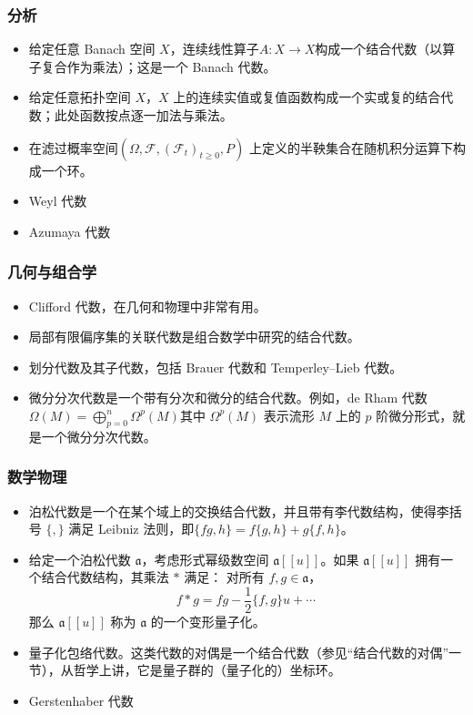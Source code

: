 \subsubsection{分析}
\begin{itemize}
\item 给定任意 Banach 空间 $X$，连续线性算子$A : X \to X$构成一个结合代数（以算子复合作为乘法）；这是一个 Banach 代数。
\item 给定任意拓扑空间 $X$，$X$ 上的连续实值或复值函数构成一个实或复的结合代数；此处函数按点逐一加法与乘法。
\item 在滤过概率空间$(\Omega, \mathcal{F}, (\mathcal{F}_t)_{t \geq 0}, P)$
上定义的半鞅集合在随机积分运算下构成一个环。
\item Weyl 代数
\item Azumaya 代数
\end{itemize}
\subsubsection{几何与组合学}
\begin{itemize}
\item Clifford 代数，在几何和物理中非常有用。
\item 局部有限偏序集的关联代数是组合数学中研究的结合代数。
\item 划分代数及其子代数，包括 Brauer 代数和 Temperley–Lieb 代数。
\item 微分分次代数是一个带有分次和微分的结合代数。例如，de Rham 代数$\Omega(M) = \bigoplus_{p=0}^n \Omega^p(M)$其中 $\Omega^p(M)$ 表示流形 $M$ 上的 $p$ 阶微分形式，就是一个微分分次代数。
\end{itemize}
\subsubsection{数学物理}
\begin{itemize}
\item 泊松代数是一个在某个域上的交换结合代数，并且带有李代数结构，使得李括号 $\{,\}$ 满足 Leibniz 法则，即$\{fg, h\} = f \{g, h\} + g \{f, h\}$。
\item 给定一个泊松代数 $\mathfrak{a}$，考虑形式幂级数空间 $\mathfrak{a}[\![u]\!]$。如果 $\mathfrak{a}[\![u]\!]$ 拥有一个结合代数结构，其乘法 $*$ 满足：
  对所有 $f, g \in \mathfrak{a}$，
  $$
  f * g = fg - \frac{1}{2} \{f, g\} u + \cdots~
  $$
  那么 $\mathfrak{a}[\![u]\!]$ 称为 $\mathfrak{a}$ 的一个变形量子化。
\item 量子化包络代数。这类代数的对偶是一个结合代数（参见“结合代数的对偶”一节），从哲学上讲，它是量子群的（量子化的）坐标环。
\item Gerstenhaber 代数
\end{itemize}
